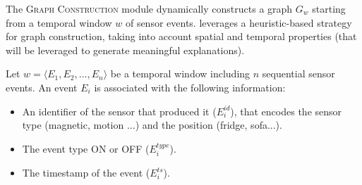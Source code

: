 



The \textsc{Graph Construction} module dynamically constructs a graph $G_w$ starting from a temporal window $w$ of sensor events. \acronym{} leverages a heuristic-based strategy for graph construction, taking into account spatial and temporal properties (that will be leveraged to generate meaningful explanations).

Let $w=\langle E_1, E_2, \dots, E_n \rangle$ be a temporal window including $n$ sequential sensor events. An event $E_i$ is associated with the following information:
\begin{itemize}
    \item An identifier of the sensor that produced it ($E_i^{id}$), that encodes the sensor type (magnetic, motion ...) and the position (fridge, sofa...).
    \item The event type ON or OFF ($E_i^{type}$).
    \item The timestamp of the event ($E_i^{ts}$).
\end{itemize}

